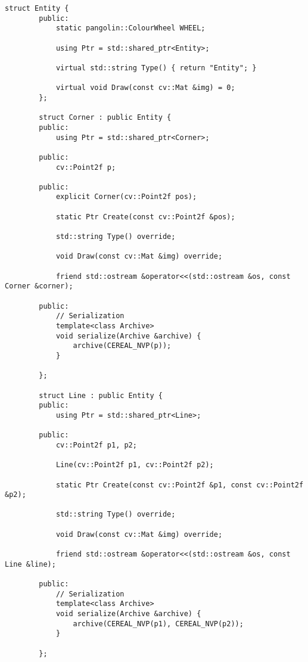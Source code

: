 \documentclass[12pt, onecolumn]{article}
\newcommand\normf{\fangsong}
\begin{document}
	\begin{lstlisting}[caption={\normf 点和直线的数据结构}]
	    struct Entity {
	    public:
	        static pangolin::ColourWheel WHEEL;
	
	        using Ptr = std::shared_ptr<Entity>;
	
	        virtual std::string Type() { return "Entity"; }
	
	        virtual void Draw(const cv::Mat &img) = 0;
	    };
	
	    struct Corner : public Entity {
	    public:
	        using Ptr = std::shared_ptr<Corner>;
	
	    public:
	        cv::Point2f p;
	
	    public:
	        explicit Corner(cv::Point2f pos);
	
	        static Ptr Create(const cv::Point2f &pos);
	
	        std::string Type() override;
	
	        void Draw(const cv::Mat &img) override;
	
	        friend std::ostream &operator<<(std::ostream &os, const Corner &corner);
	
	    public:
	        // Serialization
	        template<class Archive>
	        void serialize(Archive &archive) {
	            archive(CEREAL_NVP(p));
	        }
	
	    };
	
	    struct Line : public Entity {
	    public:
	        using Ptr = std::shared_ptr<Line>;
	
	    public:
	        cv::Point2f p1, p2;
	
	        Line(cv::Point2f p1, cv::Point2f p2);
	
	        static Ptr Create(const cv::Point2f &p1, const cv::Point2f &p2);
	
	        std::string Type() override;
	
	        void Draw(const cv::Mat &img) override;
	
	        friend std::ostream &operator<<(std::ostream &os, const Line &line);
	
	    public:
	        // Serialization
	        template<class Archive>
	        void serialize(Archive &archive) {
	            archive(CEREAL_NVP(p1), CEREAL_NVP(p2));
	        }
	
	    };
	\end{lstlisting}
\end{document}
